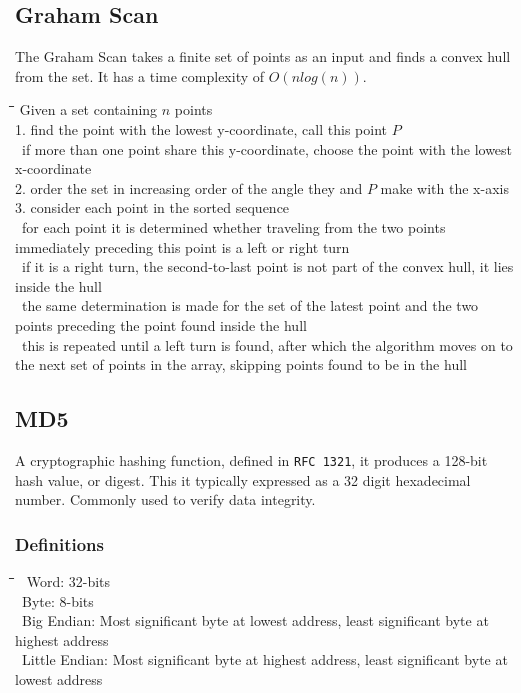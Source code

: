\documentclass[10pt,letterpaper]{scrartcl}
\newcommand{\tbul}{\textbullet}
\newcommand{\tend}{\>\textendash}
\newcommand{\tasc}{\>\>\textasteriskcentered}
\newcommand{\tabDef}{\hspace{2em}\=\hspace{2em}\=\hspace{2em}\=\hspace{2em}\=\kill}
\begin{document}
\subsection{Graham Scan}
The Graham Scan takes a finite set of points as an input and finds a convex hull from the set. It has a time complexity of $O(nlog(n))$. 
\begin{tabbing}\tabDef
	Given a set containing $n$ points \\
	1. find the point with the lowest y-coordinate, call this point $P$ \\
	\tend\ if more than one point share this y-coordinate, choose the point with the lowest x-coordinate \\
	2. order the set in increasing order of the angle they and $P$ make with the x-axis \\
	3. consider each point in the sorted sequence \\
	\tend\ for each point it is determined whether traveling from the two points immediately preceding this point is a left or right turn \\
	\tasc\ if it is a right turn, the second-to-last point is not part of the convex hull, it lies inside the hull \\
	\tasc\ the same determination is made for the set of the latest point and the two points preceding the point found inside the hull\\
	\tasc\ this is repeated until a left turn is found, after which the algorithm moves on to the next set of points in the array, skipping points found to be in the hull \\
\end{tabbing}

\subsection{MD5}
A cryptographic hashing function, defined in \texttt{RFC 1321}, it produces a 128-bit hash value, or digest. This it typically expressed as a 32 digit hexadecimal number. Commonly used to verify data integrity.
\subsubsection*{Definitions}
\begin{tabbing}\tabDef
	\tbul\ Word: 32-bits \\
	\tbul\ Byte: 8-bits \\
	\tbul\ Big Endian: Most significant byte at lowest address, least significant byte at highest address \\
	\tbul\ Little Endian: Most significant byte at highest address, least significant byte at lowest address
\end{tabbing}
\end{document}
